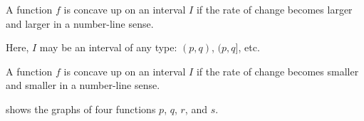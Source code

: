 \begin{pccspecialcomment}
A function $f$ is concave up on an interval $I$ if the rate of change becomes larger and larger in a number-line sense. 

Here, $I$ may be an interval of any type: $(p, q)$, $(p, q]$, etc.

A function $f$ is concave up on an interval $I$ if the rate of change becomes smaller and smaller in a number-line sense.\end{pccspecialcomment}

\begin{exercises}
\begin{problem}\label{fun:prob:incdec}
 shows the graphs of four functions $p$, $q$, $r$, and $s$.


\end{problem}
\end{exercises}
